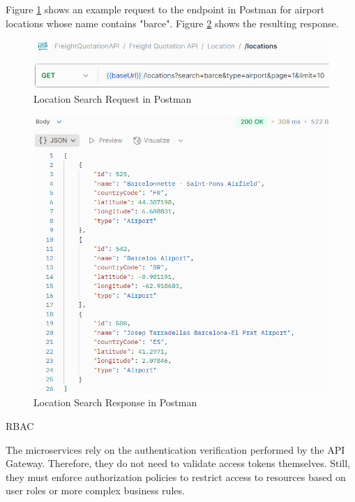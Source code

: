 \documentclass[12pt, reqno, oneside]{amsbook}
\makeatletter
\def\subsection{\@startsection{subsection}{2}%
      \z@{.5\linespacing\@plus.7\linespacing}{.25\linespacing}%
      {\normalfont\bfseries\flushleft}}
\theoremstyle{definition}
\theoremstyle{definition}
\numberwithin{section}{chapter}
\numberwithin{table}{chapter}
\numberwithin{figure}{chapter}
\makeatother
\begin{document}
Figure \ref{Figure:LocationSearchRequestPostman} shows an example request to the endpoint in Postman for airport locations whose name contains "barce". Figure \ref{Figure:LocationSearchResponsePostman} shows the resulting response.

\begin{figure}[H]
  \centering
  \includegraphics[width=0.9\linewidth]{images/LocationSearchRequestPostman.png}
  \caption{\label{Figure:LocationSearchRequestPostman}Location Search Request in Postman}
\end{figure}

\begin{figure}[H]
  \centering
  \includegraphics[width=0.8\linewidth]{images/LocationSearchResponsePostman.png}
  \caption{\label{Figure:LocationSearchResponsePostman}Location Search Response in Postman}
\end{figure}

\pagebreak

\subsection{\texorpdfstring{\ac{RBAC}}{RBAC}}
\label{Subsection:RBAC}

The microservices rely on the authentication verification performed by the \ac{API} Gateway. Therefore, they do not need to validate access tokens themselves. Still, they must enforce authorization policies to restrict access to resources based on user roles or more complex business rules.
\end{document}
